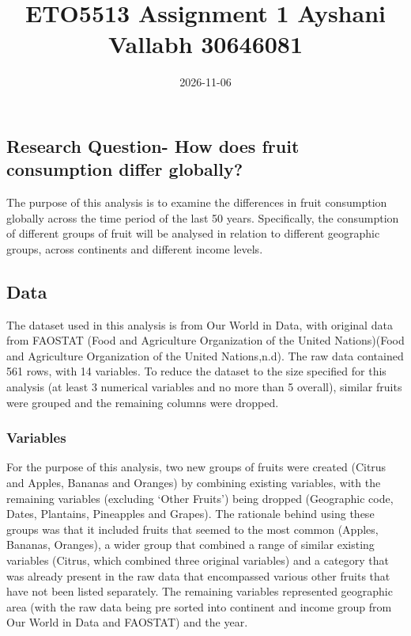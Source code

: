 \documentclass[
]{article}
\title{ETO5513 Assignment 1 Ayshani Vallabh 30646081}
\author{}
\date{\vspace{-2.5em}2026-11-06}
\begin{document}
\maketitle

\subsection{Research Question- How does fruit consumption differ
globally?}\label{research-question--how-does-fruit-consumption-differ-globally}

The purpose of this analysis is to examine the differences in fruit
consumption globally across the time period of the last 50 years.
Specifically, the consumption of different groups of fruit will be
analysed in relation to different geographic groups, across continents
and different income levels.

\subsection{Data}\label{data}

The dataset used in this analysis is from Our World in Data, with
original data from FAOSTAT (Food and Agriculture Organization of the
United Nations)(Food and Agriculture Organization of the United
Nations,n.d). The raw data contained 561 rows, with 14 variables. To
reduce the dataset to the size specified for this analysis (at least 3
numerical variables and no more than 5 overall), similar fruits were
grouped and the remaining columns were dropped.

\subsubsection{Variables}\label{variables}

For the purpose of this analysis, two new groups of fruits were created
(Citrus and Apples, Bananas and Oranges) by combining existing
variables, with the remaining variables (excluding `Other Fruits') being
dropped (Geographic code, Dates, Plantains, Pineapples and Grapes). The
rationale behind using these groups was that it included fruits that
seemed to the most common (Apples, Bananas, Oranges), a wider group that
combined a range of similar existing variables (Citrus, which combined
three original variables) and a category that was already present in the
raw data that encompassed various other fruits that have not been listed
separately. The remaining variables represented geographic area (with
the raw data being pre sorted into continent and income group from Our
World in Data and FAOSTAT) and the year.
\end{document}
